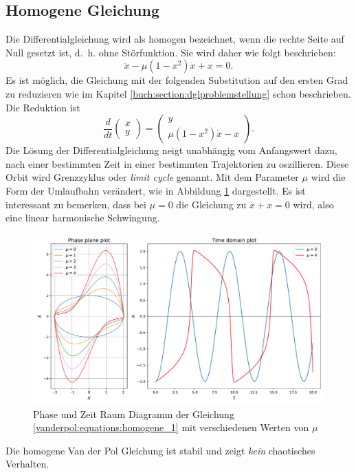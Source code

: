 \subsection{Homogene Gleichung
\label{vanderpol:subsection:homogene}}
%
Die Differentialgleichung wird als homogen bezeichnet, wenn die rechte Seite auf Null gesetzt ist, d.~h. ohne Störfunktion. Sie wird daher wie folgt beschrieben:
%
\begin{equation}
	\ddot{x} - \mu \left(1-x^{2}\right)\dot{x}+x = 0.
\label{vanderpol:equations:homogene}
\end{equation}
Es ist möglich, die Gleichung mit der folgenden Substitution auf den ersten Grad zu reduzieren wie im Kapitel \ref{buch:section:dglproblemstellung} schon beschrieben. Die Reduktion ist
%
\begin{equation}
\frac{d}{dt}\begin{pmatrix}x \\ y\end{pmatrix} = \begin{pmatrix}y \\ \mu \left(1-x^{2}\right)\dot{x}-x\end{pmatrix}.
\label{vanderpol:equations:homogene_1}
\end{equation}
Die Lösung der Differentialgleichung neigt unabhängig vom Anfangswert dazu, nach einer bestimmten Zeit in einer bestimmten Trajektorien zu oszillieren. Diese Orbit wird Grenzzyklus oder {\em limit cycle} genannt. Mit dem Parameter $\mu$ wird die Form der Umlaufbahn verändert, wie in Abbildung \ref{vanderpol:figures:homogene} dargestellt. Es ist interessant zu bemerken, dass bei $\mu = 0$ die Gleichung zu $\ddot{x} + x = 0$ wird, also eine linear harmonische Schwingung.
%
%
\begin{figure}
	\centering
	\includegraphics[width=\textwidth]{papers/vanderpol/figures/homogene_plot.pdf}
	\caption{Phase und Zeit Raum Diagramm der Gleichung \eqref{vanderpol:equations:homogene_1} mit verschiedenen Werten von $\mu$\label{vanderpol:figures:homogene}}
\end{figure}
Die homogene Van der Pol Gleichung ist stabil und zeigt {\em kein} chaotisches Verhalten.
